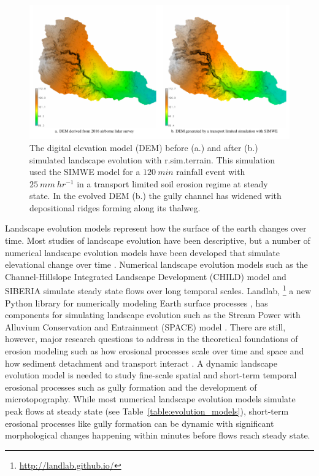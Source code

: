 \documentclass[esurf, manuscript]{copernicus}
\begin{document}



\begin{figure}%
\center
\includegraphics[width=\textwidth,height=0.925\textheight,keepaspectratio]{figures/evolution.pdf}
\caption{
The digital elevation model (DEM) 
before (a.) and after (b.)
simulated landscape evolution with
\lowercase{r.sim.terrain}. 
This simulation used the SIMWE model
for a $120~min$ rainfall event with $25~mm~hr^{-1}$
in a transport limited soil erosion regime at steady state.
In the evolved DEM (b.)
the gully channel has widened 
with depositional ridges forming along its thalweg.}
\label{fig:evolution}
\end{figure}


\introduction
Landscape evolution models represent how the surface of the earth changes over time. 
Most studies of landscape evolution have been descriptive, 
but a number of numerical landscape evolution models 
have been developed that simulate elevational change over time 
\citep{Temme2013}. 
Numerical landscape evolution models
such as the Channel-Hillslope Integrated Landscape Development (CHILD) model 
\citep{Tucker2001} 
and SIBERIA \citep{Willgoose2005}
simulate steady state flows over long temporal scales. 
Landlab,
\footnote{\url{http://landlab.github.io/}}
a new Python library for numerically modeling Earth surface processes
\citep{Hobley2017},
has components for simulating landscape evolution such as the 
Stream Power with Alluvium Conservation and Entrainment (SPACE) 
model \citep{Shobe2017}.
There are still, however, major research questions 
to address in the theoretical foundations of erosion modeling 
such as how erosional processes scale over time and space 
and how sediment detachment and transport interact \citep{Mitasova2013}. 
A dynamic landscape evolution model is needed to study
fine-scale spatial and short-term temporal erosional processes
such as gully formation and the development of microtopography. 
While most numerical landscape evolution models 
simulate peak flows at steady state
(see Table~\ref{table:evolution_models}),
short-term erosional processes like gully formation can be dynamic
with significant morphological changes happening within minutes
before flows reach steady state. 
\end{document}
